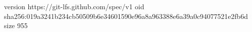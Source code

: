 version https://git-lfs.github.com/spec/v1
oid sha256:019a3241b234cb50509b6e34601590e96a8a963388e6a39a0c94077521e2fb6d
size 955
